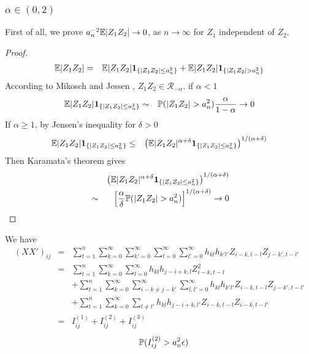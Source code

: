 \documentclass{article}
\begin{document}
\subsubsection[alpha in (0,2)]{$\alpha \in (0,2)$}
First of all, we prove $a_n^{-2}\mathbb{E}|Z_1 Z_2| \to 0$, as $n \to \infty$
for $Z_1$ independent of $Z_2$.
\begin{proof}
  \begin{eqnarray*}
    \mathbb{E}|Z_1 Z_2| &=& \mathbb{E}|Z_1 Z_2|\mathbf{1}_{\{|Z_1 Z_2| \leq a_n^2\}} + \mathbb{E}|Z_1
    Z_2|\mathbf{1}_{\{|Z_1 Z_2| > a_n^2\}} \\
  \end{eqnarray*}
  According to Mikosch and Jessen \cite{JessenMikosch2006}, $Z_1 Z_2
  \in \mathcal R_{-\alpha}$. if $\alpha < 1$
  \begin{eqnarray*}
    \mathbb{E}|Z_1 Z_2|\mathbf{1}_{\{|Z_1 Z_2| \leq a_n^2\}} &\sim& \mathbb{P}(|Z_1 Z_2| > a_n^2)
    {\alpha \over 1 - \alpha} \to 0
  \end{eqnarray*}
  If $\alpha \geq 1$, by Jensen's inequality for $\delta > 0$
  \begin{eqnarray*}
    \mathbb{E}|Z_1 Z_2|\mathbf{1}_{\{|Z_1 Z_2| \leq a_n^2\}} &\leq&
    \left(\mathbb{E}|Z_1 Z_2|^{\alpha + \delta}\mathbf{1}_{\{|Z_1 Z_2| \leq
        a_n^2\}}\right)^{1/(\alpha + \delta)}
  \end{eqnarray*}
  Then Karamata's theorem gives
  \begin{eqnarray*}
    && \left(\mathbb{E}|Z_1 Z_2|^{\alpha + \delta}\mathbf{1}_{\{|Z_1 Z_2| \leq
        a_n^2\}}\right)^{1/(\alpha + \delta)} \\
    &\sim& \left[
      {\alpha \over \delta} \mathbb{P}(|Z_1 Z_2| > a_n^2)
      \right]^{1/(\alpha + \delta)} \to 0
  \end{eqnarray*}

  
\end{proof}

We have
\begin{eqnarray*}
  (XX')_{ij} &=& \sum_{t=1}^n \sum_{k=0}^\infty \sum_{k'=0}^\infty
  \sum_{l=0}^\infty \sum_{l'=0}^\infty h_{kl} h_{k'l'} Z_{i-k,t-l}
  Z_{j-k',t-l'} \\
  &=& \sum_{t=1}^n \sum_{k=0}^\infty \sum_{l=0}^\infty h_{kl}
  h_{j-i+k,l} Z_{i-k, t-l}^2 \\
  && + \sum_{t=1}^n \sum_{k=0}^\infty \sum_{i-k \neq j-k'}^\infty
  \sum_{l,l'=0}^\infty h_{kl} h_{k'l'} Z_{i-k,t-l} Z_{j-k',t-l'} \\
  && + \sum_{t=1}^n \sum_{k=0}^\infty \sum_{l\neq l'} h_{kl}
  h_{j-i+k, l'} Z_{i-k,t-l} Z_{i-k,t-l'} \\
  &=& I^{(1)}_{ij} + I^{(2)}_{ij} + I^{(3)}_{ij}
\end{eqnarray*}
\begin{eqnarray*}
  && \mathbb{P}(I^{(2)}_{ij} > a_n^2 \epsilon) \\
\end{eqnarray*}
\end{document}
